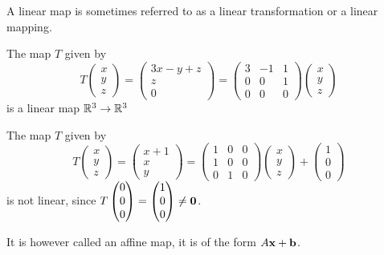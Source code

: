 \documentclass[10pt, a4paper]{article}
\begin{document}
A linear map is sometimes referred to as a linear transformation or a linear mapping.

\begin{example}
    The map $T$ given by
    \[
    T\begin{pmatrix}
        x \\ y \\ z
    \end{pmatrix}
    =
    \begin{pmatrix}
        3x - y + z \\ z \\ 0
    \end{pmatrix}
    =
    \begin{pmatrix}
        3 & -1 & 1 \\ 0 & 0 & 1 \\ 0 & 0 & 0
    \end{pmatrix}
    \begin{pmatrix}
        x \\ y \\ z
    \end{pmatrix}
    \]
    is a linear map $\mathbb{R} ^ 3 \rightarrow \mathbb{R} ^ 3$
\end{example}

\begin{example}
    The map $T$ given by
    \[
    T\begin{pmatrix}
        x \\ y \\ z
    \end{pmatrix}
    =
    \begin{pmatrix}
        x + 1 \\ x \\ y
    \end{pmatrix}
    =
    \begin{pmatrix}
        1 & 0 & 0 \\ 1 & 0 & 0 \\ 0 & 1 & 0
    \end{pmatrix}
    \begin{pmatrix}
        x \\ y \\ z
    \end{pmatrix}
    +
    \begin{pmatrix}
        1 \\ 0 \\ 0
    \end{pmatrix}
    \]
    is not linear,
    since $T\begin{pmatrix}
        0 \\ 0 \\ 0
    \end{pmatrix} = \begin{pmatrix}
        1 \\ 0 \\ 0
    \end{pmatrix} \neq \mathbf{0}$.

    It is however called an affine map,
    it is of the form $A\mathbf{x} + \mathbf{b}$.
\end{example}
\end{document}

